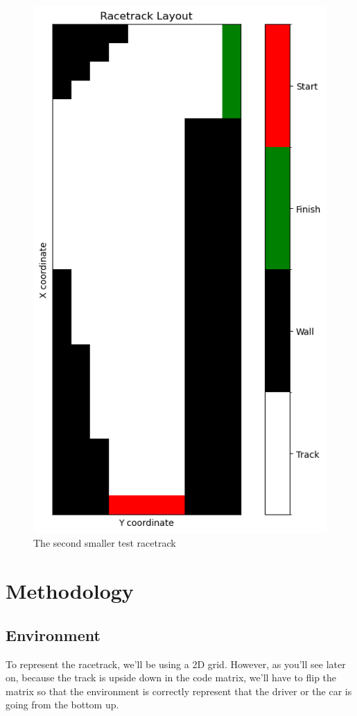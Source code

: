 \documentclass{article}
\begin{document}
\begin{figure}[h!]
\centering
\includegraphics[scale=0.2]{./images/test_racetrack2.png}
\caption{The second smaller test racetrack}
\label{fig:test-racetrack2}
\end{figure}

\section{Methodology}
\subsection{Environment}
To represent the racetrack, we'll be using a 2D grid. However, as you'll see
later on, because the track is upside down in the code matrix, we'll have to
flip the matrix so that the environment is correctly represent that the driver
or the car is going from the bottom up.
\end{document}

